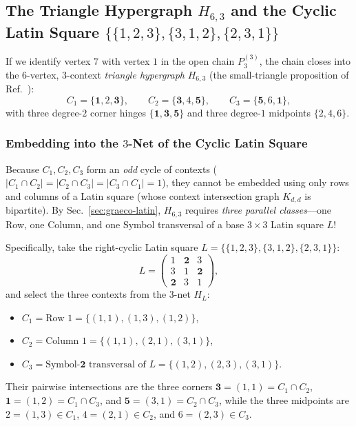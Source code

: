 \documentclass[aps,pra,reprint,superscriptaddress,longbibliography,nofootinbib,floatfix,10pt]{revtex4-2}
\theoremstyle{definition}\newtheorem{definition}[theorem]{Definition}
\theoremstyle{remark}\newtheorem{remark}[theorem]{Remark}
\begin{document}
\subsection{The Triangle Hypergraph \texorpdfstring{$H_{6,3}$}{H6,3} and the Cyclic Latin Square \texorpdfstring{$\{\{1,2,3\},\{3,1,2\},\{2,3,1\}\}$}{{{1,2,3},{3,1,2},{2,3,1}}}}\label{sec:triangle}

If we identify vertex $7$ with vertex $1$ in the open chain $P_3^{(3)}$, the chain closes into the $6$-vertex, $3$-context \emph{triangle hypergraph} $H_{6,3}$ (the small-triangle proposition of Ref.~\cite{svozil2026contexts}):
\begin{equation}\label{eq:H63}
C_1=\{\mathbf{1},2,\mathbf{3}\},\qquad C_2=\{\mathbf{3},4,\mathbf{5}\},\qquad C_3=\{\mathbf{5},6,\mathbf{1}\},
\end{equation}
with three degree-$2$ corner hinges $\{\mathbf{1},\mathbf{3},\mathbf{5}\}$ and three degree-$1$ midpoints $\{2,4,6\}$.

\subsubsection{Embedding into the \texorpdfstring{$3$}{3}-Net of the Cyclic Latin Square}
Because $C_1,C_2,C_3$ form an \emph{odd} cycle of contexts ($|C_1\cap C_2|=|C_2\cap C_3|=|C_3\cap C_1|=1$), they cannot be embedded using only rows and columns of a Latin square (whose context intersection graph $K_{d,d}$ is bipartite). By Sec.~\ref{sec:graeco-latin}, $H_{6,3}$ requires \emph{three parallel classes}—one Row, one Column, and one Symbol transversal of a base $3\times 3$ Latin square $L$!

Specifically, take the right-cyclic Latin square $L=\{\{1,2,3\},\{3,1,2\},\{2,3,1\}\}$:
\begin{equation}\label{eq:cyclic-L3}
L=\begin{pmatrix}
1 & \mathbf{2} & 3\\
3 & 1 & \mathbf{2}\\
\mathbf{2} & 3 & 1
\end{pmatrix},
\end{equation}
and select the three contexts from the $3$-net $H_L$:
\begin{itemize}
\item $C_1=\text{Row 1}=\{(1,1),(1,3),(1,2)\}$,
\item $C_2=\text{Column 1}=\{(1,1),(2,1),(3,1)\}$,
\item $C_3=\text{Symbol-}\mathbf{2}\text{ transversal of }L=\{(1,2),(2,3),(3,1)\}$.
\end{itemize}
Their pairwise intersections are the three corners $\mathbf{3}=(1,1)=C_1\cap C_2$, $\mathbf{1}=(1,2)=C_1\cap C_3$, and $\mathbf{5}=(3,1)=C_2\cap C_3$, while the three midpoints are $2=(1,3)\in C_1$, $4=(2,1)\in C_2$, and $6=(2,3)\in C_3$.
\end{document}
